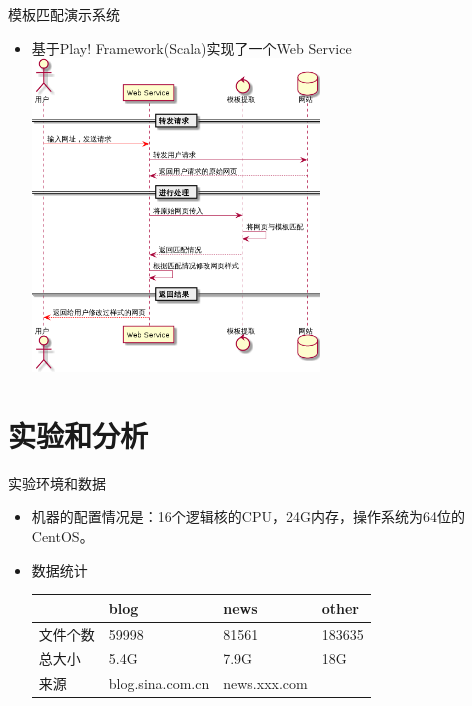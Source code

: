 \documentclass[presentation]{beamer}
\begin{document}
\begin{frame}[label=sec-2-24]{模板匹配演示系统}
\begin{itemize}
\item 基于Play! Framework(Scala)实现了一个Web Service
\includegraphics[width=0.6\textwidth]{./demo.png}
\end{itemize}
\end{frame}
\section{实验和分析}
\label{sec-3}
\begin{frame}[label=sec-3-1]{实验环境和数据}
\begin{itemize}
\item 机器的配置情况是：16个逻辑核的CPU，24G内存，操作系统为64位的CentOS。
\item 数据统计
\begin{table}[h]
\centering
\begin{tabular}{llll}
\toprule
& blog & news & other \\
\hline
文件个数 & 59998 & 81561 & 183635 \\
总大小 & 5.4G & 7.9G & 18G \\
来源 & blog.sina.com.cn &  news.xxx.com &  \\
\bottomrule
\end{tabular}
\end{table}
\end{itemize}
\end{frame}
\end{document}

